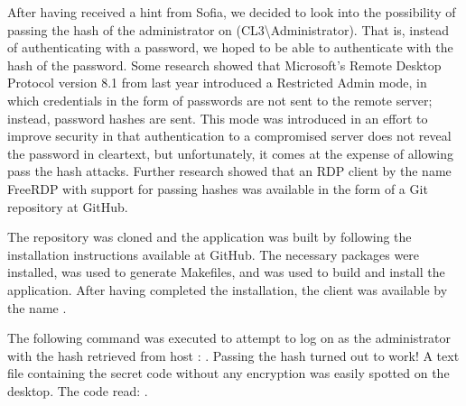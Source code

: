 After having received a hint from Sofia, we decided to look into the possibility of passing the hash of the administrator on  (CL3\textbackslash Administrator). That is, instead of authenticating with a password, we hoped to be able to authenticate with the hash of the password. Some research showed that Microsoft's Remote Desktop Protocol version 8.1 from last year introduced a Restricted Admin mode, in which credentials in the form of passwords are not sent to the remote server; instead, password hashes are sent. This mode was introduced in an effort to improve security in that authentication to a compromised server does not reveal the password in cleartext, but unfortunately, it comes at the expense of allowing pass the hash attacks\cite{portcullis_blog13}. Further research showed that an RDP client by the name FreeRDP with support for passing hashes was available in the form of a Git repository at GitHub\cite{portcullis_tools13}\cite{freerdp_git_repo}.

The repository was cloned and the application was built by following the installation instructions available at GitHub\cite{freerdp_installation_instructions}. The necessary packages were installed,  was used to generate Makefiles, and  was used to build and install the application. After having completed the installation, the client was available by the name .

The following command was executed to attempt to log on as the administrator with the hash retrieved from host : . Passing the hash turned out to work! A text file containing the secret code without any encryption was easily spotted on the desktop. The code read: .

